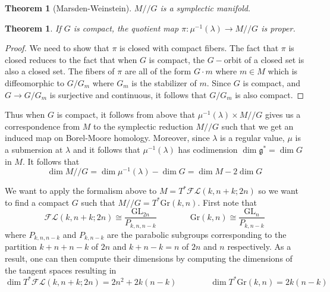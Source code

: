 \documentclass[12pt]{amsart}
\numberwithin{equation}{section}
\newtheorem{Theorem}[equation]{Theorem}
\theoremstyle{definition}
\numberwithin{figure}{section}
\newcommand{\grass}[2]{\mathrm{Gr}(#1,#2)}
\newcommand{\fl}{\mathcal{FL}}
\newcommand{\gl}{\mathrm{GL}}
\begin{document}
\begin{Theorem}[Marsden-Weinstein]
$M//G$ is a symplectic manifold. 
\end{Theorem}

\begin{Theorem}
If $G$ is compact, the quotient map $\pi: \mu^{-1}(\lambda)\to M//G$ is proper.
\end{Theorem}
\begin{proof}
We need to show that $\pi$ is closed with compact fibers. The fact that $\pi$ is closed reduces to the fact that when $G$ is compact, the $G-$orbit of a closed set is also a closed set. The fibers of $\pi$ are all of the form $G\cdot m$ where $m\in M$ which is diffeomorphic to $G/ G_m$ where $G_m$ is the stabilizer of $m$. Since $G$ is compact, and $G\to G / G_m$ is surjective and continuous, it follows that $G / G_m$ is also compact.  
\end{proof}

Thus when $G$ is compact, it follows from above that $\mu^{-1}(\lambda)\times M//G$ gives us a correspondence from $M$ to the symplectic reduction $M//G$ such that we get an induced map on Borel-Moore homology. Moreover, since $\lambda$ is a regular value, $\mu$ is a submersion at $\lambda$ and it follows that $\mu^{-1}(\lambda)$ has codimension $\dim \mathfrak{g}^*=\dim G$ in $M$. It follows that 
\begin{equation}
\label{dimeq}
\dim M//G=\dim \mu^{-1}(\lambda)-\dim G=\dim M-2\dim G
\end{equation}

We want to apply the formalism above to $M=T^*\fl(k, n+k; 2n)$ so we want to find a compact $G$ such that $M//G=T^*\grass{k}{n}$. First note that 
\[  \fl(k, n+k; 2n)\cong \frac{\gl_{2n}}{  P_{k,n,n-k}  }\qquad \qquad  \grass{k}{n}\cong \frac{\gl_n}{P_{k, n-k} } \]
where $P_{k,n,n-k}$ and $P_{k, n-k}$ are the parabolic subgroups corresponding to the partition $k+n+n-k$ of $2n$ and $k+n-k=n$ of $2n$ and $n$ respectively. As a result, one can then compute their dimensions by computing the dimensions of the tangent spaces resulting in
\[ \dim T^*\fl(k, n+k; 2n) = 2n^2+2k(n-k) \qquad \qquad \dim T^*\grass{k}{n}=2k(n-k) \]
\end{document}

